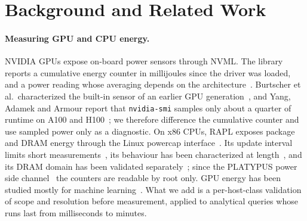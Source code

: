\documentclass[sigconf]{acmart}
\begin{document}
\section{Background and Related Work}
\label{sec:related}

\paragraph{Measuring GPU and CPU energy.}
NVIDIA GPUs expose on-board power sensors through NVML. The library reports a cumulative
energy counter in millijoules since the driver was loaded, and a power reading whose
averaging depends on the architecture~\cite{nvml_api}. Burtscher et al.\ characterized the
built-in sensor of an earlier GPU generation~\cite{burtscher2014k20}, and Yang, Adamek and
Armour report that \texttt{nvidia-smi} samples only about a quarter of runtime on A100 and
H100~\cite{yang2024nvidiasmi}; we therefore difference the cumulative counter and use sampled
power only as a diagnostic. On x86 CPUs, RAPL exposes package and DRAM energy through the
Linux powercap interface~\cite{linux_powercap}. Its update interval limits short
measurements~\cite{hahnel2012rapl}, its behaviour has been characterized at
length~\cite{khan2018rapl}, and its DRAM domain has been validated
separately~\cite{desrochers2016dram}; since the PLATYPUS power side channel~\cite{lipp2021platypus}
the counters are readable by root only. GPU energy has been studied mostly for machine learning~\cite{strubell2019energy,you2023zeus,patel2024llmpower}.
What we add is a per-host-class validation of scope and resolution before measurement, applied
to analytical queries whose runs last from milliseconds to minutes.
\end{document}
